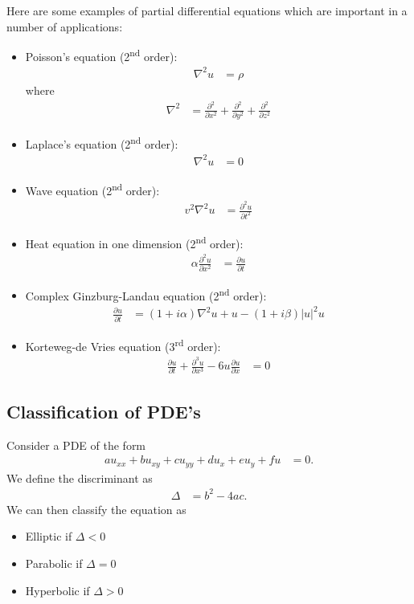 \documentclass[twocolumn]{myarticle}
\begin{document}
Here are some examples of partial differential equations which are important in a number of applications:
\begin{itemize}
\item
    Poisson's equation (2\textsuperscript{nd} order):
    \begin{align}
        \nabla^2 u &= \rho
    \end{align}
    where
    \begin{align}
        \nabla^2 &= \frac{\partial^2}{\partial x^2} + \frac{\partial^2}{\partial y^2} + \frac{\partial^2}{\partial z^2}
    \end{align}
    
\item
    Laplace's equation (2\textsuperscript{nd} order):
    \begin{align}
        \nabla^2 u &= 0
    \end{align}
\item
    Wave equation (2\textsuperscript{nd} order):
    \begin{align}
        v^2 \nabla^2 u &= \frac{\partial^2 u}{\partial t^2}
    \end{align}
\item
    Heat equation in one dimension (2\textsuperscript{nd} order):
    \begin{align}
        \alpha \frac{\partial^2 u}{\partial x^2} &= \frac{\partial u}{\partial t}
    \end{align}
\item
    Complex Ginzburg-Landau equation (2\textsuperscript{nd} order):
    \begin{align}
        \frac{\partial u}{\partial t} &= (1 + i \alpha) \nabla^2 u + u - (1 + i \beta) |u|^2 u 
    \end{align}
\item
    Korteweg-de Vries equation (3\textsuperscript{rd} order):
    \begin{align}
        \frac{\partial u}{\partial t} + \frac{\partial^3 u}{\partial x^3} - 6 u \frac{\partial u}{\partial x} &= 0
    \end{align}
\end{itemize}

\subsection{Classification of PDE's}
\label{subsec:classification_of_pde_s}

Consider a PDE of the form
\begin{align}
    a u_{xx} + b u_{xy} + c u_{yy} + d u_{x} + e u_{y} + fu &= 0.
\end{align}
We define the discriminant as
\begin{align}
    \Delta &= b^2 - 4 a c.
\end{align}
We can then classify the equation as
\begin{itemize}
\item
    Elliptic if $ \Delta < 0 $
\item
    Parabolic if $ \Delta = 0 $
\item
    Hyperbolic if $ \Delta > 0 $
\end{itemize}
\end{document}
